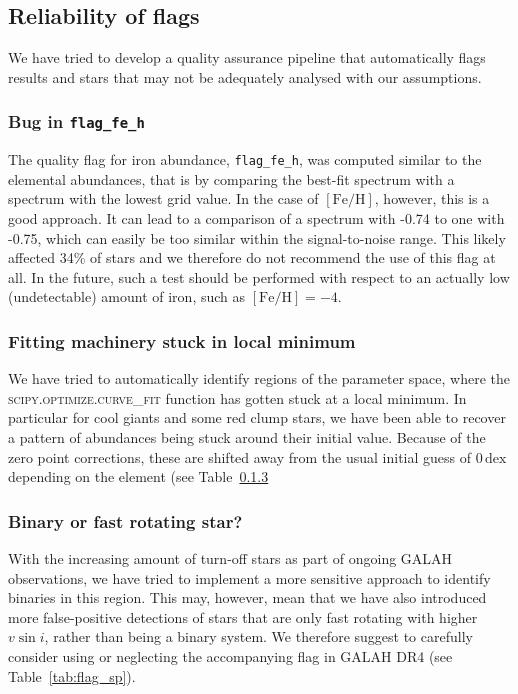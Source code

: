 \documentclass[
  journal=pasa,
  manuscript=research-paper, %
  year=2023,
  volume=37
]{cup-journal}
\newcommand{\feh}{$\mathrm{[Fe/H]}$\xspace}
\newcommand{\vsini}{$v \sin i$\xspace}
\begin{document}
\subsection{Reliability of flags} \label{sec:caveats_flags}

We have tried to develop a quality assurance pipeline that automatically flags results and stars that may not be adequately analysed with our assumptions.

\subsubsection{Bug in \texttt{flag\_fe\_h}}

The quality flag for iron abundance, \texttt{flag\_fe\_h}, was computed similar to the elemental abundances, that is by comparing the best-fit spectrum with a spectrum with the lowest grid value. In the case of \feh, however, this is a good approach. It can lead to a comparison of a spectrum with -0.74 to one with -0.75, which can easily be too similar within the signal-to-noise range. This likely affected 34\% of stars and we therefore do not recommend the use of this flag at all. In the future, such a test should be performed with respect to an actually low (undetectable) amount of iron, such as $\mathrm{[Fe/H]} = -4$.

\subsubsection{Fitting machinery stuck in local minimum}

We have tried to automatically identify regions of the parameter space, where the \textsc{scipy.optimize.curve_fit} function has gotten stuck at a local minimum. In particular for cool giants and some red clump stars, we have been able to recover a pattern of abundances being stuck around their initial value. Because of the zero point corrections, these are shifted away from the usual initial guess of $0\,\mathrm{dex}$ depending on the element (see Table~\ref{}

\subsubsection{Binary or fast rotating star?}

With the increasing amount of turn-off stars as part of ongoing GALAH observations, we have tried to implement a more sensitive approach to identify binaries in this region. This may, however, mean that we have also introduced more false-positive detections of stars that are only fast rotating with higher \vsini, rather than being a binary system. We therefore suggest to carefully consider using or neglecting the accompanying flag in GALAH DR4 (see Table~\ref{tab:flag_sp}).
\end{document}
